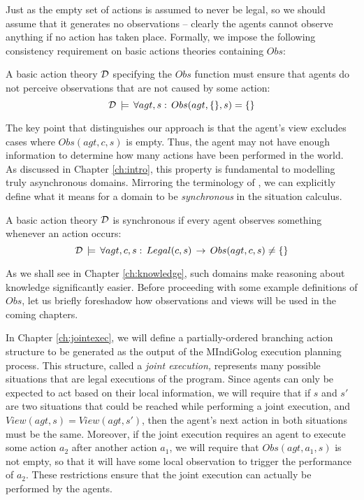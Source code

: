 Just as the empty set of actions is assumed to never be legal, so
we should assume that it generates no observations -- clearly the
agents cannot observe anything if no action has taken place. Formally,
we impose the following consistency requirement on basic actions theories
containing $Obs$:

\begin{defnL}
 A basic action theory
$\mathcal{D}$ specifying the $Obs$ function must ensure that agents do not
perceive observations that are not caused by some action:\[
\mathcal{D}\,\models\,\forall agt,s:\, Obs(agt,\{\},s)=\{\}\]

\end{defnL}
The key point that distinguishes our approach is that the agent's
view excludes cases where $Obs(agt,c,s)$ is empty. Thus, the agent
may not have enough information to determine how many actions have
been performed in the world. As discussed in Chapter \ref{ch:intro},
this property is fundamental to modelling truly asynchronous domains.
Mirroring the terminology of \citep{vanBentham06tree_of_knowledge},
we can explicitly define what it means for a domain to be \emph{synchronous}
in the situation calculus.

\begin{defnL}
 A basic action theory $\mathcal{D}$
is synchronous if every agent observes something whenever an action
occurs:\[
\mathcal{D}\,\models\,\forall agt,c,s:\, Legal(c,s)\,\rightarrow\, Obs(agt,c,s)\neq\{\}\]

\end{defnL}
As we shall see in Chapter \ref{ch:knowledge}, such domains make
reasoning about knowledge significantly easier. Before proceeding
with some example definitions of $Obs$, let us briefly foreshadow
how observations and views will be used in the coming chapters.

In Chapter \ref{ch:jointexec}, we will define a partially-ordered
branching action structure to be generated as the output of the MIndiGolog
execution planning process. This structure, called a \emph{joint execution,}
represents many possible situations that are legal executions of the
program. Since agents can only be expected to act based on their local
information, we will require that if $s$ and $s'$ are two situations
that could be reached while performing a joint execution, and $View(agt,s)=View(agt,s')$,
then the agent's next action in both situations must be the same.
Moreover, if the joint execution requires an agent to execute some
action $a_{2}$ after another action $a_{1}$, we will require that
$Obs(agt,a_{1},s)$ is not empty, so that it will have some local
observation to trigger the performance of $a_{2}$. These restrictions
ensure that the joint execution can actually be performed by the agents.

